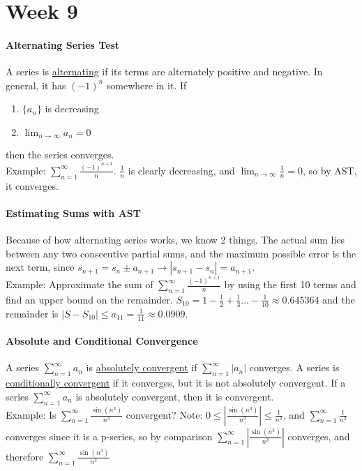 \documentclass[10pt,letter]{article}
\begin{document}
\section*{Week 9}
\paragraph{Alternating Series Test} A series is \underline{alternating} if its terms are alternately positive and negative. In general, it has $(-1)^n$ somewhere in it. If \begin{enumerate}
    \item $\{a_n\}$ is decreasing 
    \item $\lim_{n\rightarrow\infty}a_n=0$
\end{enumerate}
then the series converges. \\ 
Example: $\sum_{n=1}^\infty \frac{(-1)^{n+1}}{n}$. $\frac{1}{n}$ is clearly decreasing, and $\lim_{n\rightarrow\infty}\frac{1}{n}=0$, so by AST, it converges.

\paragraph{Estimating Sums with AST} Because of how alternating series works, we know 2 things. The actual sum lies between any two consecutive partial sums, and the maximum possible error is the next term, since $s_{n+1}=s_n\pm a_{n+1}\rightarrow |s_{n+1}-s_n|=a_{n+1}$. \\ 
Example: Approximate the sum of $\sum_{n=1}^\infty \frac{(-1)^{n+1}}{n}$ by using the first 10 terms and find an upper bound on the remainder. $S_10=1-\frac{1}{2}+\frac{1}{3}\ldots-\frac{1}{10} \approx 0.645364$ and the remainder is $|S-S_10| \leq a_{11} = \frac{1}{11} \approx 0.0909$.

\paragraph{Absolute and Conditional Convergence} A series $\sum_{n=1}^\infty a_n$ is \underline{absolutely convergent} if $\sum_{n=1}^\infty |a_n|$ converges. A series is \underline{conditionally convergent} if it converges, but it is not absolutely convergent. If a series $\sum_{n=1}^\infty a_n$ is absolutely convergent, then it is convergent. \\ 
Example: Is $\sum_{n=1}^\infty \frac{\sin(n^3)}{n^3}$ convergent? Note: $0\leq \left|\frac{\sin(n^3)}{n^3}\right|\leq \frac{1}{n^3}$, and $\sum_{n=1}^\infty \frac{1}{n^3}$ converges since it is a p-series, so by comparison $\sum_{n=1}^\infty \left|\frac{\sin(n^3)}{n^3}\right|$ converges, and therefore $\sum_{n=1}^\infty \frac{\sin(n^3)}{n^3}$
\end{document}
